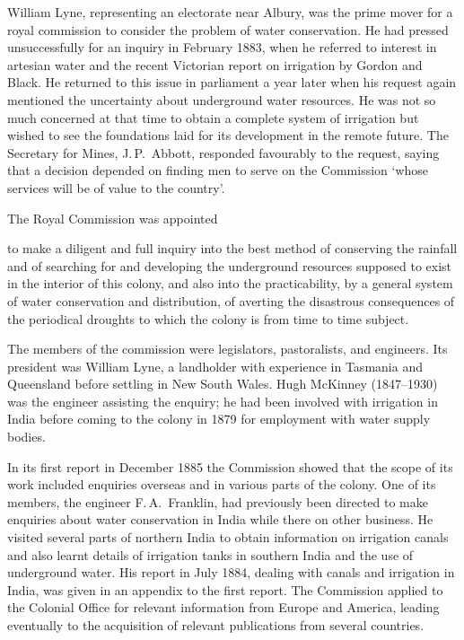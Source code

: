 William Lyne,  representing an electorate near Albury,
was the prime mover for a royal commission to consider the problem of
water conservation.  He had pressed unsuccessfully for an inquiry in
February 1883, when he referred to interest in artesian water and the
recent Victorian report on irrigation by Gordon and Black.  He
returned to this issue in parliament a year later when his request
again mentioned the uncertainty about underground water resources.  He
was not so much concerned at that time to obtain a complete system of
irrigation but wished to see the foundations laid for its development
in the remote future.  The Secretary for Mines, J.\,P.~Abbott,
 responded favourably to the request, saying
that a decision depended on finding men to serve on the Commission
`whose services will be of value to the country'.

The Royal Commission was appointed
\begin{Quote}
	to make a diligent and full inquiry into the best method of
	conserving the rainfall and of searching for and developing
	the underground resources supposed to exist in the interior of
	this colo\-ny, and also into the practicability, by a general
	system of water conservation and distribution, of averting the
	disastrous consequ\-en\-ces of the periodical droughts to which
	the colony is from time to time subject.
\end{Quote}
The members of the commission were legislators, pastoralists, and
engineers. Its president was William Lyne, a landholder with
experience in Tasmania and Queensland before settling in New South
Wales. Hugh McKinney  (1847--1930) was the
engineer assisting the enquiry; he had been involved with irrigation
in India before coming to the colony in 1879 for employment with water
supply bodies.

In its first report in December 1885 the Commission showed that the
scope of its work included enquiries overseas and in various parts of
the colony.  One of its members, the engineer F.\,A.~Franklin,
 had
previously been directed to make enquiries about water conservation in
India while there on other business.  He visited several parts of
northern India to obtain information on irrigation canals and also
learnt details of irrigation tanks in southern India and the use of
underground water.  His report in July 1884, dealing with canals and
irrigation in India,  was given in an appendix to the
first report.  The Commission applied to the Colonial Office for
relevant information from Europe and America, leading eventually to
the acquisition of relevant publications from several
countries.

